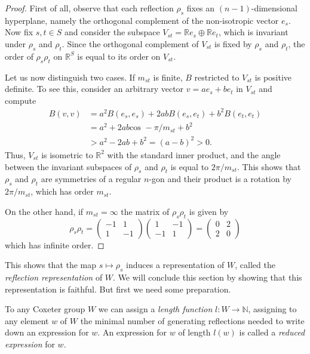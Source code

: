 \documentclass{article}
\theoremstyle{definition}
\begin{document}
\begin{proof}
First of all, observe that each reflection $\rho_s$ fixes an $(n-1)$-dimensional hyperplane, namely the orthogonal complement of the non-isotropic vector $e_s$. Now fix $s,t\in S$ and consider the subspace $V_{st} = \mathbb{R}e_s \oplus \mathbb{R}e_t$, which is invariant under $\rho_s$ and $\rho_t$. Since the orthogonal complement of $V_{st}$ is fixed by $\rho_s$ and $\rho_t$, the order of $\rho_s\rho_t$ on $\mathbb{R}^S$ is equal to its order on $V_{st}$.

Let us now distinguish two cases. If $m_{st}$ is finite, $B$ restricted to $V_{st}$ is positive definite. To see this, consider an arbitrary vector $v = ae_s + b e_t$ in $V_{st}$ and compute
\begin{align*}
B(v, v) & = a^2B(e_s, e_s) + 2abB(e_s, e_t) + b^2B(e_t, e_t)\\
& = a^2 + 2ab\text{cos } -\pi / m_{st} + b^2 \\
& > a^2 - 2ab + b^2 = (a - b)^2 > 0.
\end{align*}
Thus, $V_{st}$ is isometric to $\mathbb{R}^2$ with the standard inner product, and the angle between the invariant subspaces of $\rho_s$ and $\rho_t$ is equal to $2 \pi / m_{st}$. This shows that $\rho_s$ and $\rho_t$ are symmetries of a regular $n$-gon and their product is a rotation by $2\pi/m_{st}$, which has order $m_{st}$.

On the other hand, if $m_{st} = \infty$ the matrix of $\rho_s\rho_t$ is given by
$$\rho_s \rho_t = \left( \begin{matrix}
-1 & 1 \\ 1 & -1
\end{matrix} \right)
\left( \begin{matrix}
1 & -1 \\ -1 & 1
\end{matrix} \right)
= \left( \begin{matrix}
0 & 2 \\ 2 & 0
\end{matrix} \right)
$$
which has infinite order.
\end{proof}

This shows that the map $s \mapsto \rho_s$ induces a representation of $W$, called the \textit{reflection representation} of $W$. We will conclude this section by showing that this representation is faithful. But first we need some preparation.

To any Coxeter group $W$ we can assign a \textit{length function} $l: W \rightarrow \mathbb{N}$, assigning to any element $w$ of $W$ the minimal number of generating reflections needed to write down an expression for $w$. An expression for $w$ of length $l(w)$ is called a \textit{reduced expression} for $w$.
\end{document}
